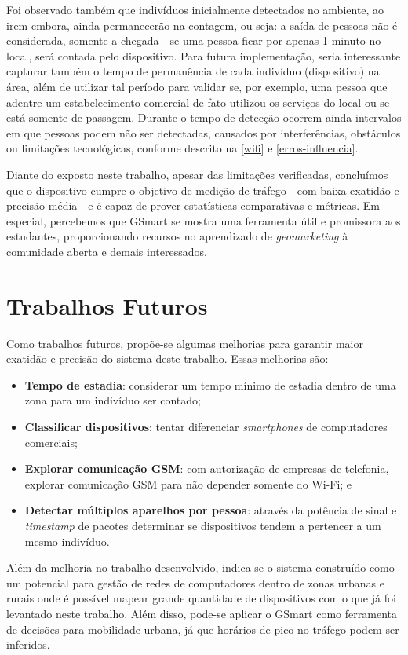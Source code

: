 Foi observado também que indivíduos inicialmente detectados no ambiente, ao irem embora, ainda permanecerão na contagem, ou seja: a saída de pessoas não é considerada, somente a chegada - se uma pessoa ficar por apenas 1 minuto no local, será contada pelo dispositivo. Para futura implementação, seria interessante capturar também o tempo de permanência de cada indivíduo (dispositivo) na área, além de utilizar tal período para validar se, por exemplo, uma pessoa que adentre um estabelecimento comercial de fato utilizou os serviços do local ou se está somente de passagem. Durante o tempo de detecção ocorrem ainda intervalos em que pessoas podem não ser detectadas, causados por interferências, obstáculos ou limitações tecnológicas, conforme descrito na \autoref{wifi} e \autoref{erros-influencia}.

Diante do exposto neste trabalho, apesar das limitações verificadas, concluímos
que o dispositivo cumpre o objetivo de medição de tráfego - com baixa exatidão e precisão média -
e é capaz de prover estatísticas comparativas e métricas. Em especial, percebemos que GSmart se mostra uma
ferramenta útil e promissora aos estudantes, proporcionando recursos no aprendizado de \emph{geomarketing} à comunidade aberta e demais interessados.


\section{Trabalhos Futuros}
Como trabalhos futuros, propõe-se algumas melhorias para garantir maior exatidão e
precisão do sistema deste trabalho. Essas melhorias são:
\begin{itemize}
    \item \textbf{Tempo de estadia}: considerar um tempo mínimo de estadia dentro de uma zona para um indivíduo ser contado;
    \item \textbf{Classificar dispositivos}: tentar diferenciar \emph{smartphones} de computadores comerciais;
    \item \textbf{Explorar comunicação GSM}: com autorização de empresas de telefonia, explorar comunicação GSM para não depender somente do Wi-Fi; e
    \item \textbf{Detectar múltiplos aparelhos por pessoa}: através da potência de sinal e \emph{timestamp}
    de pacotes determinar se dispositivos tendem a pertencer a um mesmo indivíduo.
\end{itemize}

Além da melhoria no trabalho desenvolvido, indica-se o sistema construído como um potencial para gestão de redes
de computadores dentro de zonas urbanas e rurais onde é possível mapear grande quantidade de dispositivos com o
que já foi levantado neste trabalho. Além disso, pode-se aplicar o GSmart como ferramenta de decisões para mobilidade urbana, já que horários de pico no tráfego podem ser inferidos.
